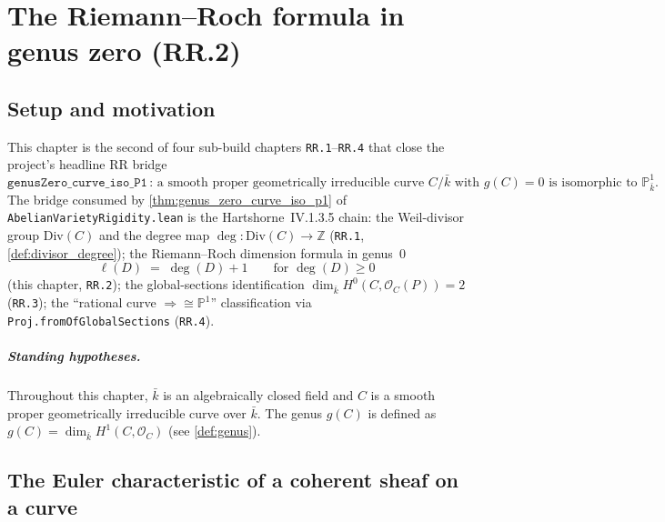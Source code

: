 
\chapter{The Riemann--Roch formula in genus zero (RR.2)}
\label{chap:RiemannRoch_RRFormula}


\section{Setup and motivation}

This chapter is the second of four sub-build chapters \texttt{RR.1}--\texttt{RR.4}
that close the project's headline RR bridge
\[
  \mathtt{genusZero\_curve\_iso\_P1}
  \,\colon\,
  \text{a smooth proper geometrically irreducible curve \(C / \bar k\) with
  \(g(C) = 0\) is isomorphic to \(\mathbb P^1_{\bar k}\).}
\]
The bridge consumed by
\cref{thm:genus_zero_curve_iso_p1} of
\texttt{AbelianVarietyRigidity.lean} is the Hartshorne~IV.1.3.5 chain:
the Weil-divisor group \(\mathrm{Div}(C)\) and the degree map $\deg \colon \mathrm{Div}(C)
\to \mathbb Z$ (\texttt{RR.1}, \cref{def:divisor_degree}); the
Riemann--Roch dimension formula in genus~\(0\)
\[
  \ell(D) \;=\; \deg(D) + 1 \qquad \text{for } \deg(D) \geq 0
\]
(this chapter, \texttt{RR.2}); the global-sections identification
\(\dim_{\bar k} H^0(C, \mathcal O_C(P)) = 2\) (\texttt{RR.3}); the
``rational curve \(\Rightarrow \cong \mathbb P^1\)'' classification via
\texttt{Proj.fromOfGlobalSections} (\texttt{RR.4}).

\paragraph{Standing hypotheses.} Throughout this chapter, \(\bar k\) is an
algebraically closed field and \(C\) is a smooth proper geometrically
irreducible curve over \(\bar k\). The genus \(g(C)\) is defined as
\(g(C) = \dim_{\bar k} H^1(C, \mathcal O_C)\) (see \cref{def:genus}).

\section{The Euler characteristic of a coherent sheaf on a curve}

